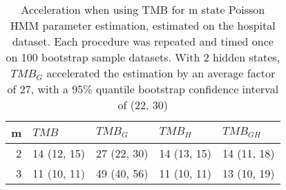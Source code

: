 \documentclass[bimj,fleqn]{w-art}\usepackage[]{graphicx}\usepackage[]{color}
\theoremstyle{plain}
\theoremstyle{definition}
\begin{document}
\begin{table}[ht]
\centering
\begin{tabular}{rllll}
  \hline
m & \textit{${TMB}$} & \textit{${TMB_G}$} & \textit{${TMB_H}$} & \textit{${TMB_{GH}}$} \\ 
  \hline
2 & 14 (12, 15) & 27 (22, 30) & 14 (13, 15) & 14 (11, 18) \\ 
  3 & 11 (10, 11) & 49 (40, 56) & 11 (10, 11) & 13 (10, 19) \\ 
   \hline
\end{tabular}
\caption{Acceleration when using TMB for m state Poisson HMM parameter estimation, estimated on the hospital dataset. Each procedure was repeated and timed once on 100 bootstrap sample datasets. With 2 hidden states, $TMB_G$ accelerated the estimation by an average factor of 27, with a 95\% quantile bootstrap confidence interval of (22, 30)} 
\label{table:speed-hosp}
\end{table}
\end{document}
